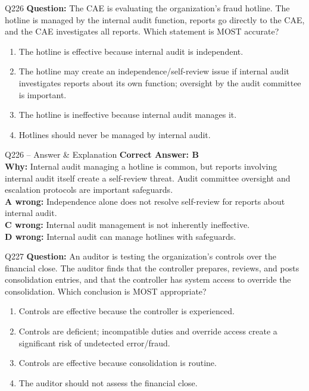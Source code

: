 \documentclass[aspectratio=169,10pt]{beamer}
\begin{document}
	\begin{frame}[t]{Q226}
		\small
		\textbf{Question:} The CAE is evaluating the organization's fraud hotline. The hotline is managed by the internal audit function, reports go directly to the CAE, and the CAE investigates all reports. Which statement is MOST accurate?
		\begin{enumerate}[label=\Alph*.,itemsep=1pt,topsep=2pt]
			\item The hotline is effective because internal audit is independent.
			\item The hotline may create an independence/self-review issue if internal audit investigates reports about its own function; oversight by the audit committee is important.
			\item The hotline is ineffective because internal audit manages it.
			\item Hotlines should never be managed by internal audit.
		\end{enumerate}
	\end{frame}
	
	\begin{frame}[t]{Q226 -- Answer \& Explanation}
		\small
		\textbf{Correct Answer: B} \\[4pt]
		\textbf{Why:} Internal audit managing a hotline is common, but reports involving internal audit itself create a self-review threat. Audit committee oversight and escalation protocols are important safeguards. \\[4pt]
		\textbf{A wrong:} Independence alone does not resolve self-review for reports about internal audit. \\[2pt]
		\textbf{C wrong:} Internal audit management is not inherently ineffective. \\[2pt]
		\textbf{D wrong:} Internal audit can manage hotlines with safeguards.
	\end{frame}
	
	\begin{frame}[t]{Q227}
		\small
		\textbf{Question:} An auditor is testing the organization's controls over the financial close. The auditor finds that the controller prepares, reviews, and posts consolidation entries, and that the controller has system access to override the consolidation. Which conclusion is MOST appropriate?
		\begin{enumerate}[label=\Alph*.,itemsep=1pt,topsep=2pt]
			\item Controls are effective because the controller is experienced.
			\item Controls are deficient; incompatible duties and override access create a significant risk of undetected error/fraud.
			\item Controls are effective because consolidation is routine.
			\item The auditor should not assess the financial close.
		\end{enumerate}
	\end{frame}
	
\end{document}
